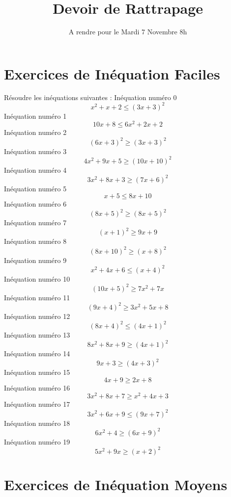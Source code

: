 \documentclass{article}
\title{Devoir de Rattrapage}
\date{A rendre pour le Mardi 7 Novembre 8h}\usepackage{natbib}
\begin{document}
\maketitle
 \section{Exercices de In\'equation Faciles}

 R\'esoudre les in\'equations suivantes : 
In\'equation num\'ero 0 \[x^{2} + x + 2 \leq \left(3 x + 3\right)^{2}\]In\'equation num\'ero 1 \[10 x + 8 \leq 6 x^{2} + 2 x + 2\]In\'equation num\'ero 2 \[\left(6 x + 3\right)^{2} \geq \left(3 x + 3\right)^{2}\]In\'equation num\'ero 3 \[4 x^{2} + 9 x + 5 \geq \left(10 x + 10\right)^{2}\]In\'equation num\'ero 4 \[3 x^{2} + 8 x + 3 \geq \left(7 x + 6\right)^{2}\]In\'equation num\'ero 5 \[x + 5 \leq 8 x + 10\]In\'equation num\'ero 6 \[\left(8 x + 5\right)^{2} \geq \left(8 x + 5\right)^{2}\]In\'equation num\'ero 7 \[\left(x + 1\right)^{2} \geq 9 x + 9\]In\'equation num\'ero 8 \[\left(8 x + 10\right)^{2} \geq \left(x + 8\right)^{2}\]In\'equation num\'ero 9 \[x^{2} + 4 x + 6 \leq \left(x + 4\right)^{2}\]In\'equation num\'ero 10 \[\left(10 x + 5\right)^{2} \geq 7 x^{2} + 7 x\]In\'equation num\'ero 11 \[\left(9 x + 4\right)^{2} \geq 3 x^{2} + 5 x + 8\]In\'equation num\'ero 12 \[\left(8 x + 4\right)^{2} \leq \left(4 x + 1\right)^{2}\]In\'equation num\'ero 13 \[8 x^{2} + 8 x + 9 \geq \left(4 x + 1\right)^{2}\]In\'equation num\'ero 14 \[9 x + 3 \geq \left(4 x + 3\right)^{2}\]In\'equation num\'ero 15 \[4 x + 9 \geq 2 x + 8\]In\'equation num\'ero 16 \[3 x^{2} + 8 x + 7 \geq x^{2} + 4 x + 3\]In\'equation num\'ero 17 \[3 x^{2} + 6 x + 9 \leq \left(9 x + 7\right)^{2}\]In\'equation num\'ero 18 \[6 x^{2} + 4 \geq \left(6 x + 9\right)^{2}\]In\'equation num\'ero 19 \[5 x^{2} + 9 x \geq \left(x + 2\right)^{2}\]
 \section{Exercices de In\'equation Moyens}
\end{document}
